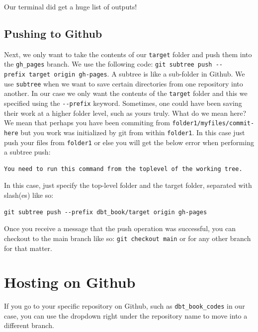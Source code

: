 \documentclass[
]{book}
\begin{document}
Our terminal did get a huge list of outputs!

\hypertarget{pushing-to-github}{%
\subsection{Pushing to Github}\label{pushing-to-github}}

Next, we only want to take the contents of our \texttt{target} folder and push them into the \texttt{gh\_pages} branch. We use the following code: \texttt{git\ subtree\ push\ -\/-prefix\ target\ origin\ gh-pages}. A subtree is like a sub-folder in Github. We use \texttt{subtree} when we want to save certain directories from one repository into another. In our case we only want the contents of the \texttt{target} folder and this we specified using the \texttt{-\/-prefix} keyword. Sometimes, one could have been saving their work at a higher folder level, such as yours truly. What do we mean here? We mean that perhaps you have been commiting from \texttt{folder1/myfiles/commit-here} but you work was initialized by git from within \texttt{folder1}. In this case just push your files from \texttt{folder1} or else you will get the below error when performing a subtree push:

\begin{verbatim}
You need to run this command from the toplevel of the working tree.
\end{verbatim}

In this case, just specify the top-level folder and the target folder, separated with slash(es) like so:

\begin{verbatim}
git subtree push --prefix dbt_book/target origin gh-pages
\end{verbatim}

Once you receive a message that the push operation was successful, you can checkout to the main branch like so: \texttt{git\ checkout\ main} or for any other branch for that matter.

\hypertarget{hosting-on-github}{%
\section{Hosting on Github}\label{hosting-on-github}}

If you go to your specific repository on Github, such as \texttt{dbt\_book\_codes} in our case, you can use the dropdown right under the repository name to move into a different branch.
\end{document}
